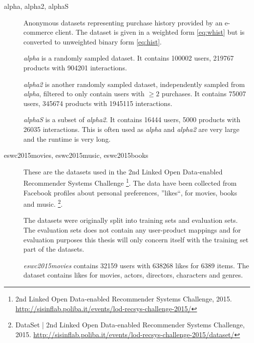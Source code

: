 \begin{description}
    \item[alpha, alpha2, alphaS] \hfill

        Anonymous datasets representing purchase history provided by an e-commerce client. The dataset is given in a weighted form \eqref{eq:whist} but is converted to unweighted binary form \eqref{eq:hist}.

        \textit{alpha} is a randomly sampled dataset. It contains 100002 users, 219767 products with 904201 interactions.

        \textit{alpha2} is another randomly sampled dataset, independently sampled from \textit{alpha}, filtered to only contain users with $\geq 2$ purchases. It contains 75007 users, 345674 products with 1945115 interactions.

        \textit{alphaS} is a subset of \textit{alpha2}. It contains 16444 users, 5000 products with 26035 interactions. This is often used as \textit{alpha} and \textit{alpha2} are very large and the runtime is very long.




    \item[eswc2015movies, eswc2015music, eswc2015books] \hfill

        These are the datasets used in the 2nd Linked Open Data-enabled Recommender Systems Challenge
        \footnote{2nd Linked Open Data-enabled Recommender Systems Challenge, 2015. \url{http://sisinflab.poliba.it/events/lod-recsys-challenge-2015/}}.
        The data have been collected from Facebook profiles about personal preferences, ''likes``, for movies, books and music.
        \footnote{DataSet | 2nd Linked Open Data-enabled Recommender Systems Challenge, 2015. \url{http://sisinflab.poliba.it/events/lod-recsys-challenge-2015/dataset/}}.

        The datasets were originally split into training sets and evaluation sets. The evaluation sets does not contain any user-product mappings and for evaluation purposes this thesis will only concern itself with the training set part of the datasets.

        \textit{eswc2015movies} contains 32159 users with 638268 likes for 6389 items. The dataset contains likes for movies, actors, directors, characters and genres.


\end{description}
